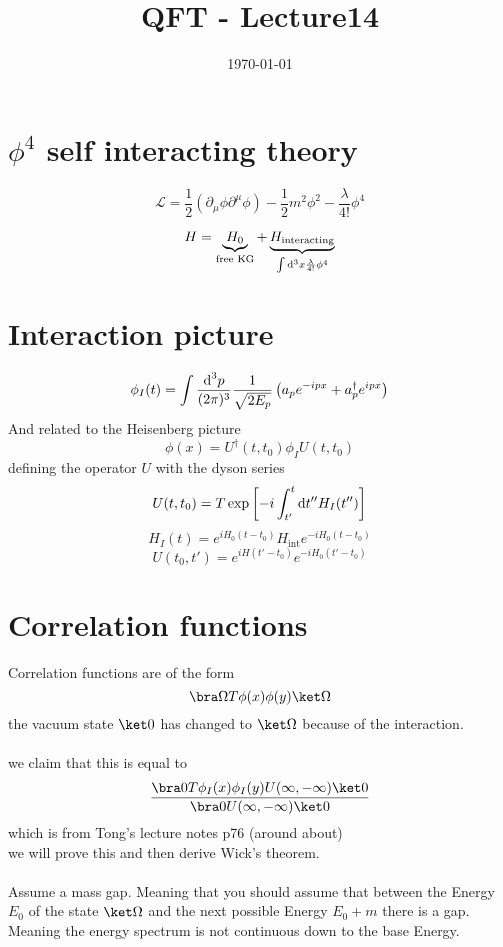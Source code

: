 \documentclass[]{scrartcl}
\title{QFT - Lecture14}
\author{}
\date{\today}
\begin{document}
\maketitle
\newpage
\tableofcontents
\newpage

\section{$\phi^4$ self interacting theory} 

$$
\mathcal{L} = \frac{1}{2}\left(\partial_\mu\phi \partial^\mu\phi\right) - \frac{1}{2}m^2\phi^2 - \frac{\lambda}{4!}\phi^4
$$

$$
H = \underbrace{H_0}_{\text{free KG}} + \underbrace{H_\text{interacting}}_{\int\text d^3x \frac{\lambda}{4!}\phi^4}
$$

\section{Interaction picture}

$$
\phi_I(t) = \int\frac{\text d^3p}{(2\pi)^3}\frac{1}{\sqrt{2E_p}}\left(a_p e^{-ipx} + a_p^\dagger e^{ipx}\right)
$$
And related to the Heisenberg picture
$$
\phi(x) = U^\dagger(t,t_0) \phi_I U(t,t_0)
$$
defining the operator $U$ with the dyson series
\begin{equation}
	U(t,t_0) = T\exp\left[-i\int_{t'}^{t}\text dt'' H_I(t'')\right]
\end{equation}
$$
H_I(t) = e^{iH_0(t-t_0)}H_{\text{int}}e^{-iH_0(t-t_0)}
$$
$$
U(t_0,t') = e^{iH(t'-t_0)}e^{-iH_0(t'-t_0)}
$$

\section{Correlation functions}

Correlation functions are of the form
$$
\bra\Omega T\phi(x)\phi(y)\ket\Omega
$$
the vacuum state $\ket0$ has changed to $\ket\Omega$ because of the interaction.\\\\
we claim that this is equal to
$$
\frac{\bra0 T\phi_I(x)\phi_I(y)U(\infty,-\infty)\ket0}{\bra0 U(\infty,-\infty)\ket0}
$$
which is from Tong's lecture notes p76 (around about)\\
we will prove this and then derive Wick's theorem.\\\\
Assume a mass gap. Meaning that you should assume that between the Energy $E_0$ of the state $\ket\Omega$ and the next possible Energy $E_0 + m$ there is a gap. Meaning the energy spectrum is not continuous down to the base Energy.
\end{document}
